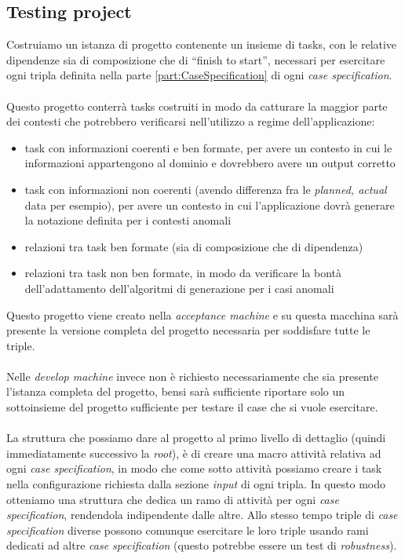 \subsection{Testing project}
Costruiamo un istanza di progetto contenente un insieme di tasks, con le
relative dipendenze sia di composizione che di ``finish to start'', necessari per
esercitare ogni tripla definita nella parte \ref{part:CaseSpecification} di 
ogni \emph{case specification}.
\\ \\
Questo progetto conterr\`a tasks costruiti in modo da catturare la maggior
parte dei contesti che potrebbero verificarsi nell'utilizzo a regime
dell'applicazione:
\begin{itemize}
  \item task con informazioni coerenti e ben formate, per avere un contesto in
  cui le informazioni appartengono al dominio e dovrebbero avere un output
  corretto
  \item task con informazioni non coerenti (avendo differenza fra le
  \emph{planned, actual} data per esempio), per avere un contesto in cui
  l'applicazione dovr\`a generare la notazione definita per i contesti anomali
  \item relazioni tra task ben formate (sia di composizione che di dipendenza)
  \item relazioni tra task non ben formate, in modo da verificare la bont\`a
  dell'adattamento dell'algoritmi di generazione per i casi anomali
\end{itemize} 
Questo progetto viene creato nella \emph{acceptance
machine} e su questa macchina sar\`a presente la versione completa del progetto necessaria per
soddisfare tutte le triple. 
\\ \\
Nelle \emph{develop machine} invece non \`e
richiesto necessariamente che sia presente l'istanza completa del progetto,
bensi sar\`a sufficiente riportare solo un sottoinsieme del progetto
sufficiente per testare il case che si vuole esercitare.
\\ \\
La struttura che possiamo dare al progetto al primo livello di dettaglio
(quindi immediatamente successivo la \emph{root}), \`e di creare una macro
attivit\`a relativa ad ogni \emph{case specification}, in modo che come sotto
attivit\`a possiamo creare i task nella configurazione richiesta dalla sezione
\emph{input} di ogni tripla. In questo modo otteniamo una struttura
che dedica un ramo di attivit\`a per ogni \emph{case specification}, rendendola
indipendente dalle altre. Allo stesso tempo triple di \emph{case specification}
 diverse possono comunque esercitare le loro triple usando rami dedicati ad
 altre \emph{case specification} (questo potrebbe essere un test di
 \emph{robustness}).
